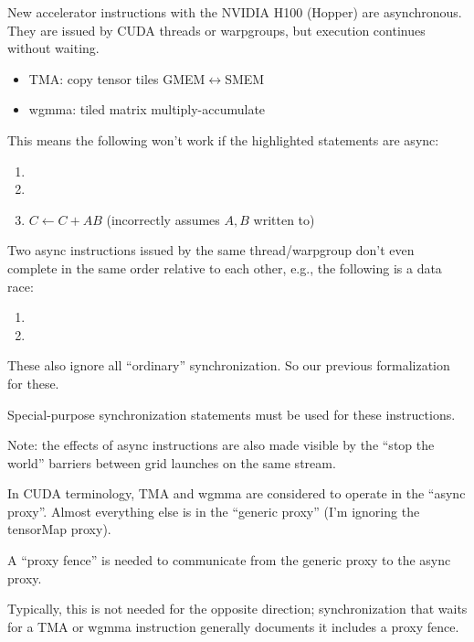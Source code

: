 \begin{minipage}[t]{0.5\textwidth}\fixminipage
New accelerator instructions with the NVIDIA H100 (Hopper) are asynchronous.
They are issued by CUDA threads or warpgroups, but execution continues without waiting.
\begin{itemize}
  \item TMA: copy tensor tiles GMEM$\leftrightarrow$SMEM
  \item wgmma: tiled matrix multiply-accumulate
\end{itemize}
This means the following won't work if the highlighted statements are async:
\begin{enumerate}
  \item {}
  \item {}
  \item $C \leftarrow C + AB$ (incorrectly assumes $A,B$ written to)
\end{enumerate}
Two async instructions issued by the same thread/warpgroup don't even complete in the same order relative to each other, e.g., the following is a data race:
\begin{enumerate}
  \item {}
  \item {}
\end{enumerate}
\end{minipage}
\hfill
\begin{minipage}[t]{0.5\textwidth}\fixminipage
These also ignore all ``ordinary'' synchronization.
So our previous formalization  for these.

Special-purpose synchronization statements must be used for these instructions.

Note: the effects of async instructions are also made visible by the ``stop the world'' barriers between grid launches on the same stream.


In CUDA terminology, TMA and wgmma are considered to operate in the ``async proxy''.
Almost everything else is in the ``generic proxy'' (I'm ignoring the tensorMap proxy).

A ``proxy fence'' is needed to communicate from the generic proxy to the async proxy.

Typically, this is not needed for the opposite direction; synchronization that waits for a TMA or wgmma instruction generally documents it includes a proxy fence.
\end{minipage}

